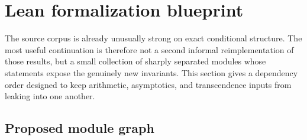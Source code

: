 \documentclass[11pt,oneside]{article}
\theoremstyle{definition}
\theoremstyle{remark}
\begin{document}
\section{Lean formalization blueprint}
\label{sec:formalization}

The source corpus is already unusually strong on exact conditional structure.  The most useful
continuation is therefore not a second informal reimplementation of those results, but a
small collection of sharply separated modules whose statements expose the genuinely new
invariants.  This section gives a dependency order designed to keep arithmetic, asymptotics,
and transcendence inputs from leaking into one another.

\subsection{Proposed module graph}
\end{document}
